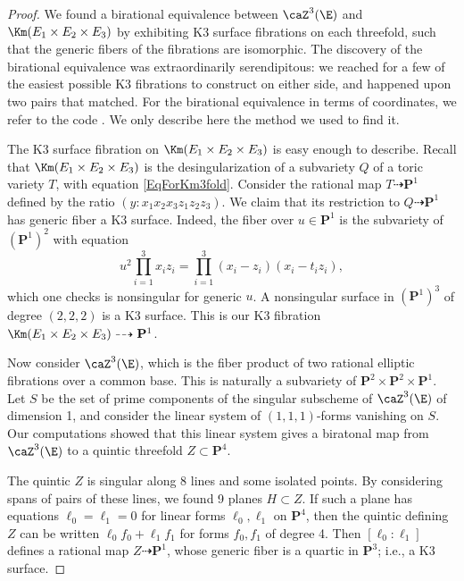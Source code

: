 \documentclass{article}
\def\P{\mathbf{P}}
\begin{document}
\begin{proof}  We found a birational equivalence between $\caZ^3(\E)$ and $\Km(E_1\times E_2\times E_3)$ by exhibiting K3 surface fibrations on each threefold, such that the generic fibers of the fibrations are isomorphic.  The discovery of the birational equivalence was extraordinarily  serendipitous:  we reached for a few of the easiest possible K3 fibrations to construct on either side, and happened upon two pairs that matched.  For the birational equivalence in terms of coordinates, we refer to the code \cite{code}. We only describe here the method we used to find it.

The K3 surface fibration on $\Km(E_1\times E_2\times E_3)$ is easy enough to describe.  Recall that $\Km(E_1\times E_2\times E_3)$ is the desingularization of a subvariety $Q$ of a toric variety $T$, with equation \eqref{EqForKm3fold}.  Consider the rational map $T\dashrightarrow \P^1$ defined by the ratio $(y:x_1x_2x_3z_1z_2z_3)$.  We claim that its restriction to $Q\dashrightarrow \P^1$ has generic fiber a K3 surface.  Indeed, the fiber over $u\in\P^1$ is the subvariety of $(\P^1)^2$ with equation
\begin{equation}
\label{EqK3FibrationOnKummer3Fold}
 u^2\prod_{i=1}^3 x_iz_i = \prod_{i=1}^3 (x_i-z_i)(x_i-t_iz_i), 
 \end{equation}
 which one checks is nonsingular for generic $u$.  A nonsingular surface in $(\P^1)^3$ of degree $(2,2,2)$ is a K3 surface.  This is our K3 fibration $\Km(E_1\times E_2 \times E_3)\dashrightarrow \P^1$.  

Now consider $\caZ^3(\E)$, which is the fiber product of two rational elliptic fibrations over a common base.  This is naturally a subvariety of $\P^2\times \P^2\times \P^1$.  Let $S$ be the set of prime components of the singular subscheme of $\caZ^3(\E)$ of dimension 1, and consider the linear system of $(1,1,1)$-forms vanishing on $S$.  Our computations showed that this linear system gives a biratonal map from $\caZ^3(\E)$ to a quintic threefold $Z\subset \P^4$.  

The quintic $Z$ is singular along $8$ lines and some isolated points.  By considering spans of pairs of these lines, we found 9 planes $H\subset Z$.  If such a plane has equations $\ell_0=\ell_1=0$ for linear forms $\ell_0,\ell_1$ on $\P^4$, then the quintic defining $Z$ can be written $\ell_0f_0+\ell_1 f_1$ for forms $f_0,f_1$ of degree 4.  Then $[\ell_0:\ell_1]$ defines a rational map $Z\dashrightarrow \P^1$, whose generic fiber is a quartic in $\P^3$; i.e., a K3 surface.  


\end{proof}
\end{document}

